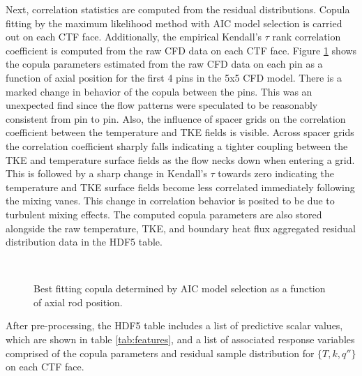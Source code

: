 Next, correlation statistics are computed from the residual distributions.
Copula fitting by the maximum likelihood method with AIC model selection is carried out on each CTF face.  Additionally, the empirical Kendall's $\tau$ rank correlation coefficient is computed from the raw CFD data on each CTF face. Figure \ref{fig:copula_predicted} shows the copula parameters estimated from the raw CFD data on each pin as a function of axial position for the first 4 pins in the 5x5 CFD model.  There is a marked change in behavior of the copula between the pins.  This was an unexpected find since the flow patterns were speculated to be reasonably consistent from pin to pin.  Also, the influence of spacer grids on the correlation coefficient between the temperature and TKE fields is visible.  Across spacer grids the correlation coefficient sharply falls indicating a tighter coupling between the TKE and temperature surface fields as the flow necks down when entering a grid.  This is followed by a sharp change in Kendall's $\tau$ towards zero indicating the temperature and TKE surface fields become less correlated immediately following the mixing vanes.  This change in correlation behavior is posited to be due to turbulent mixing effects.  The computed copula parameters are also stored alongside the raw temperature, TKE, and boundary heat flux aggregated residual distribution data in the HDF5 table.

\begin{figure}[H]%
    \captionsetup[subfigure]{justification=centering}
    \centering
    \hspace*{-1.0em}%
    \hspace*{-1.0em}%
    \\
    \hspace*{-1.0em}%
    \hspace*{-1.0em}%
    \caption[Best fitting copula to CFD data.]{Best fitting copula determined by AIC model selection as a function of axial rod position.}%
    \label{fig:copula_predicted}%
\end{figure}

After pre-processing, the HDF5 table includes a list of predictive scalar values, which are shown in table \ref{tab:features}, and a list of associated response variables comprised of the copula parameters and residual sample distribution for $\{T,k,q''\}$ on each CTF face.

